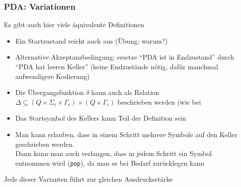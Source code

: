 \documentclass[onlymath]{beamer}
\begin{document}
\begin{frame}\frametitle{PDA: Variationen}

Es gibt auch hier viele äquivalente Definitionen\pause
\begin{itemize}
\item Ein Startzustand reicht auch aus (Übung: warum?)\pause
\item Alternative Akzeptanzbedingung: ersetze "`PDA ist in Endzustand"' durch "`PDA hat leeren Keller"'
(keine Endzustände nötig, dafür manchmal aufwendigere Kodierung)\pause
% 
\item Die Übergangsfunktion $\delta$ kann auch als Relation $\Delta\subseteq (Q\times\Sigma_\epsilon\times\Gamma_\epsilon)\times (Q\times\Gamma_\epsilon)$ beschrieben werden (wie bei \pause
\item Das Startsymbol des Kellers kann Teil der Definition sein\pause
\item Man kann erlauben, dass in einem Schritt mehrere Symbole auf den Keller geschrieben werden.
\\ {\footnotesize \textcolor{devilscss}{Dann kann man auch verlangen, dass in jedem Schritt ein Symbol entnommen wird (\texttt{pop}), da man es bei Bedarf zurücklegen kann}}
\end{itemize}
\alert{Jede dieser Varianten führt zur gleichen Ausdrucksstärke}

\end{frame}
\end{document}
